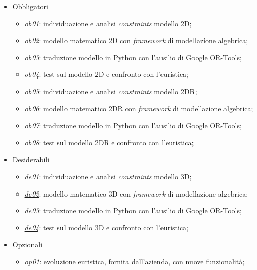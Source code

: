 \begin{itemize}
	\item Obbligatori
	\begin{itemize}
		\item \underline{\textit{ob01}}: individuazione e analisi \textit{constraints} modello 2D;
		\item \underline{\textit{ob02}}: modello matematico 2D con \textit{framework} di modellazione algebrica;
		\item \underline{\textit{ob03}}: traduzione modello in Python con l'ausilio di Google OR-Tools;
		\item \underline{\textit{ob04}}: test sul modello 2D e confronto con l'euristica;
		\item \underline{\textit{ob05}}: individuazione e analisi \textit{constraints} modello 2DR; 
		\item \underline{\textit{ob06}}: modello matematico 2DR con \textit{framework} di modellazione algebrica;
		\item \underline{\textit{ob07}}: traduzione modello in Python con l'ausilio di Google OR-Tools;
		\item \underline{\textit{ob08}}: test sul modello 2DR e confronto con l'euristica;
    \end{itemize}
	\item Desiderabili
	\begin{itemize}
		\item \underline{\textit{de01}}: individuazione e analisi \textit{constraints} modello 3D;
		\item \underline{\textit{de02}}: modello matematico 3D con \textit{framework} di modellazione algebrica;
		\item \underline{\textit{de03}}: traduzione modello in Python con l'ausilio di Google OR-Tools;
		\item \underline{\textit{de04}}: test sul modello 3D e confronto con l'euristica;
	\end{itemize}
	\item Opzionali
	\begin{itemize}
		\item \underline{\textit{op01}}: evoluzione euristica, fornita dall'azienda, con nuove funzionalità;
	\end{itemize} 
\end{itemize}

